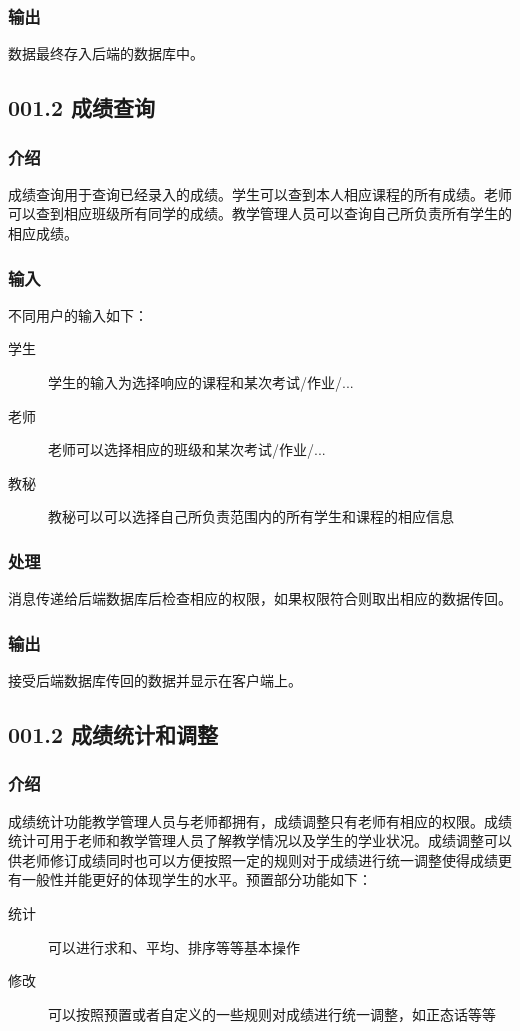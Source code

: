     \subsubsection{输出}
    数据最终存入后端的数据库中。

  \subsection{001.2 成绩查询}
    \subsubsection{介绍}
    成绩查询用于查询已经录入的成绩。学生可以查到本人相应课程的所有成绩。老师可以查到相应班级所有同学的成绩。教学管理人员可以查询自己所负责所有学生的相应成绩。
    \subsubsection{输入}
    不同用户的输入如下：
    \begin{center}\begin{description}
      \item[学生] 学生的输入为选择响应的课程和某次考试/作业/...
      \item[老师] 老师可以选择相应的班级和某次考试/作业/...
      \item[教秘] 教秘可以可以选择自己所负责范围内的所有学生和课程的相应信息
    \end{description}\end{center}
    \subsubsection{处理}
    消息传递给后端数据库后检查相应的权限，如果权限符合则取出相应的数据传回。
    \subsubsection{输出}
    接受后端数据库传回的数据并显示在客户端上。

  \subsection{001.2 成绩统计和调整}
    \subsubsection{介绍}
    成绩统计功能教学管理人员与老师都拥有，成绩调整只有老师有相应的权限。成绩统计可用于老师和教学管理人员了解教学情况以及学生的学业状况。成绩调整可以供老师修订成绩同时也可以方便按照一定的规则对于成绩进行统一调整使得成绩更有一般性并能更好的体现学生的水平。预置部分功能如下：
    \begin{description}
      \item[统计] 可以进行求和、平均、排序等等基本操作
      \item[修改] 可以按照预置或者自定义的一些规则对成绩进行统一调整，如正态话等等
    \end{description}
